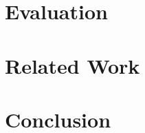 \documentclass[10pt,twocolumn]{article}
\begin{document}
\section{Evaluation}

\section{Related Work}

\section{Conclusion}

%
%
%

%
%
\end{document}
